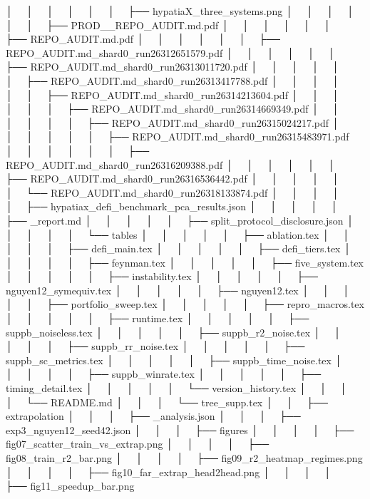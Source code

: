 │   │       │   │       │   │   ├── hypatiaX_three_systems.png
│   │       │   │       │   │   ├── PROD__REPO_AUDIT.md.pdf
│   │       │   │       │   │   ├── REPO_AUDIT.md.pdf
│   │       │   │       │   │   ├── REPO_AUDIT.md_shard0_run26312651579.pdf
│   │       │   │       │   │   ├── REPO_AUDIT.md_shard0_run26313011720.pdf
│   │       │   │       │   │   ├── REPO_AUDIT.md_shard0_run26313417788.pdf
│   │       │   │       │   │   ├── REPO_AUDIT.md_shard0_run26314213604.pdf
│   │       │   │       │   │   ├── REPO_AUDIT.md_shard0_run26314669349.pdf
│   │       │   │       │   │   ├── REPO_AUDIT.md_shard0_run26315024217.pdf
│   │       │   │       │   │   ├── REPO_AUDIT.md_shard0_run26315483971.pdf
│   │       │   │       │   │   ├── REPO_AUDIT.md_shard0_run26316209388.pdf
│   │       │   │       │   │   ├── REPO_AUDIT.md_shard0_run26316536442.pdf
│   │       │   │       │   │   └── REPO_AUDIT.md_shard0_run26318133874.pdf
│   │       │   │       │   ├── hypatiax_defi_benchmark_pca_results.json
│   │       │   │       │   ├── _report.md
│   │       │   │       │   ├── split_protocol_disclosure.json
│   │       │   │       │   └── tables
│   │       │   │       │       ├── ablation.tex
│   │       │   │       │       ├── defi_main.tex
│   │       │   │       │       ├── defi_tiers.tex
│   │       │   │       │       ├── feynman.tex
│   │       │   │       │       ├── five_system.tex
│   │       │   │       │       ├── instability.tex
│   │       │   │       │       ├── nguyen12_symequiv.tex
│   │       │   │       │       ├── nguyen12.tex
│   │       │   │       │       ├── portfolio_sweep.tex
│   │       │   │       │       ├── repro_macros.tex
│   │       │   │       │       ├── runtime.tex
│   │       │   │       │       ├── suppb_noiseless.tex
│   │       │   │       │       ├── suppb_r2_noise.tex
│   │       │   │       │       ├── suppb_rr_noise.tex
│   │       │   │       │       ├── suppb_sc_metrics.tex
│   │       │   │       │       ├── suppb_time_noise.tex
│   │       │   │       │       ├── suppb_winrate.tex
│   │       │   │       │       ├── timing_detail.tex
│   │       │   │       │       └── version_history.tex
│   │       │   │       └── README.md
│   │       │   └── tree_supp.tex
│   │       ├── extrapolation
│   │       │   ├── _analysis.json
│   │       │   ├── exp3_nguyen12_seed42.json
│   │       │   ├── figures
│   │       │   │   ├── fig07_scatter_train_vs_extrap.png
│   │       │   │   ├── fig08_train_r2_bar.png
│   │       │   │   ├── fig09_r2_heatmap_regimes.png
│   │       │   │   ├── fig10_far_extrap_head2head.png
│   │       │   │   ├── fig11_speedup_bar.png
